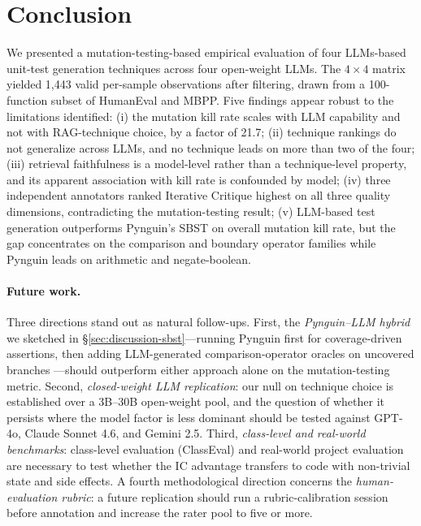 \documentclass[smallextended]{svjour3}
\begin{document}
\section{Conclusion}\label{sec:conclusion}

We presented a mutation-testing-based empirical evaluation of four
LLMs-based unit-test generation techniques across four open-weight
LLMs. The $4 \times 4$ matrix yielded 1{,}443 valid per-sample observations after filtering, drawn from a 100-function subset of HumanEval and MBPP. Five findings appear robust to the
limitations identified: (i) the mutation kill rate scales with LLM
capability and not with RAG-technique choice, by a factor of 21.7;
(ii) technique rankings do not generalize across LLMs, and no technique
leads on more than two of the four; (iii) retrieval faithfulness is
a model-level rather than a technique-level property, and its apparent
association with kill rate is confounded by model; (iv) three
independent annotators ranked Iterative Critique highest on all
three quality dimensions, contradicting the mutation-testing
result; (v) LLM-based test generation outperforms Pynguin's
SBST on overall mutation kill rate, but the gap concentrates on
the comparison and boundary operator families while Pynguin leads on
arithmetic and negate-boolean.

\paragraph{Future work.}
Three directions stand out as natural follow-ups. First, the
\emph{Pynguin--LLM hybrid} we sketched in
\S\ref{sec:discussion-sbst}—running Pynguin first for
coverage-driven assertions, then adding LLM-generated
comparison-operator oracles on uncovered branches
—should outperform either approach alone on the mutation-testing metric.
Second, \emph{closed-weight LLM replication}: our null on technique
choice is established over a 3B--30B open-weight pool, and the
question of whether it persists where the model factor is less
dominant should be tested against GPT-4o, Claude Sonnet 4.6, and
Gemini 2.5.
Third, \emph{class-level and real-world benchmarks}: class-level
evaluation (ClassEval) and real-world project evaluation are
necessary to test whether the IC advantage transfers to code with
non-trivial state and side effects. A fourth methodological
direction concerns the \emph{human-evaluation rubric}: a future
replication should run a rubric-calibration session before
annotation and increase the rater pool to five or more.
\end{document}

